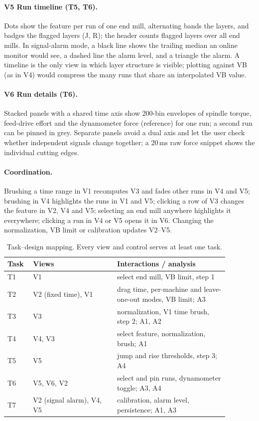 \paragraph{V5 Run timeline (T5, T6).}
Dots show the feature per run of one end mill, alternating bands the layers, and badges the flagged layers
(J, R); the header counts flagged layers over all end mills. In signal-alarm mode, a black line shows the
trailing median an online monitor would see, a dashed line the alarm level, and a triangle the alarm.
A timeline is the only view in which layer structure is visible; plotting against VB (as in V4) would compress
the many runs that share an interpolated VB value.

\paragraph{V6 Run details (T6).}
Stacked panels with a shared time axis show 200-bin envelopes of spindle torque, feed-drive effort and the
dynamometer force (reference) for one run; a second run can be pinned in grey. Separate panels avoid a dual
axis and let the user check whether independent signals change together; a 20\,ms raw force snippet shows
the individual cutting edges.

\paragraph{Coordination.}
Brushing a time range in V1 recomputes V3 and fades other runs in V4 and V5; brushing in V4 highlights the
runs in V1 and V5; clicking a row of V3 changes the feature in V2, V4 and V5; selecting an end mill anywhere
highlights it everywhere; clicking a run in V4 or V5 opens it in V6. Changing the normalization, VB limit or
calibration updates V2--V5.

\begin{table}[t]
\centering\small
\caption{Task--design mapping. Every view and control serves at least one task.}
\label{tab:mapping}
\begin{tabular}{@{}p{0.09\linewidth}p{0.34\linewidth}p{0.45\linewidth}@{}}
\toprule
Task & Views & Interactions / analysis \\
\midrule
T1 & V1 & select end mill, VB limit, step 1 \\
T2 & V2 (fixed time), V1 & drag time, per-machine and leave-one-out modes, VB limit; A3 \\
T3 & V3 & normalization, V1 time brush, step 2; A1, A2 \\
T4 & V4, V3 & select feature, normalization, brush; A1 \\
T5 & V5 & jump and rise thresholds, step 3; A4 \\
T6 & V5, V6, V2 & select and pin runs, dynamometer toggle; A3, A4 \\
T7 & V2 (signal alarm), V4, V5 & calibration, alarm level, persistence; A1, A3 \\
\bottomrule
\end{tabular}
\end{table}

